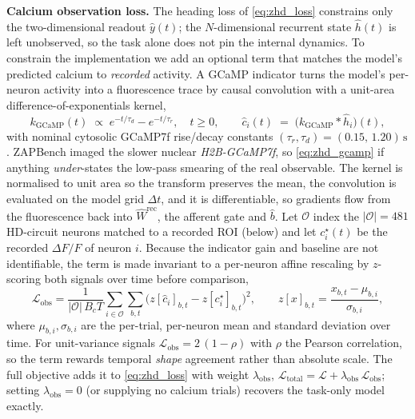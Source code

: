 \documentclass[11pt]{article}
\begin{document}
\bigskip
\noindent\textbf{Calcium observation loss.}\label{method:obs}
The heading loss of \cref{eq:zhd_loss} constrains only the
two-dimensional readout $\hat y(t)$; the $N$-dimensional recurrent state
$\hat h(t)$ is left unobserved, so the task alone does not pin the
internal dynamics. To constrain the implementation we add an optional
term that matches the model's predicted calcium to \emph{recorded}
activity. A GCaMP indicator turns the model's per-neuron activity into a
fluorescence trace by causal convolution with a unit-area
difference-of-exponentials kernel,
\begin{equation}
k_{\mathrm{GCaMP}}(t) \;\propto\; e^{-t/\tau_d} - e^{-t/\tau_r},
  \quad t \ge 0,
\qquad
\hat c_i(t) \;=\; \big(k_{\mathrm{GCaMP}} * \hat h_i\big)(t),
\label{eq:zhd_gcamp}
\end{equation}
with nominal cytosolic GCaMP7f rise/decay constants
$(\tau_r,\tau_d) = (0.15,\,1.20)\,\mathrm{s}$ \citep{dana2019}. ZAPBench
imaged the slower nuclear \emph{H2B-GCaMP7f}, so \cref{eq:zhd_gcamp} if
anything \emph{under}-states the low-pass smearing of the real observable.
The kernel is normalised to unit area so the transform
preserves the mean, the convolution is evaluated on the model grid
$\Delta t$, and it is differentiable, so gradients flow from the
fluorescence back into $\hat W^{\mathrm{rec}}$, the afferent gate and
$\hat b$. Let $\mathcal{O}$ index the $|\mathcal{O}| = 481$ HD-circuit
neurons matched to a recorded ROI (below) and let $c^{\star}_i(t)$ be the
recorded $\Delta F/F$ of neuron $i$. Because the indicator gain and
baseline are not identifiable, the term is made invariant to a per-neuron
affine rescaling by $z$-scoring both signals over time before comparison,
\begin{equation}
\mathcal{L}_{\mathrm{obs}}
  = \frac{1}{|\mathcal{O}|\,B_c T}\sum_{i\in\mathcal{O}}\sum_{b,t}
    \big(z[\hat c_i]_{b,t} - z[c^{\star}_i]_{b,t}\big)^2 ,
\qquad
z[x]_{b,t} = \frac{x_{b,t} - \mu_{b,i}}{\sigma_{b,i}},
\label{eq:zhd_obs}
\end{equation}
where $\mu_{b,i},\sigma_{b,i}$ are the per-trial, per-neuron mean and
standard deviation over time. For unit-variance signals
$\mathcal{L}_{\mathrm{obs}} = 2\,(1-\rho)$ with $\rho$ the Pearson
correlation, so the term rewards temporal \emph{shape} agreement rather
than absolute scale. The full objective adds it to \cref{eq:zhd_loss}
with weight $\lambda_{\mathrm{obs}}$,
$\mathcal{L}_{\mathrm{total}} = \mathcal{L}
  + \lambda_{\mathrm{obs}}\,\mathcal{L}_{\mathrm{obs}}$;
setting $\lambda_{\mathrm{obs}} = 0$ (or supplying no calcium trials)
recovers the task-only model exactly.
\end{document}
